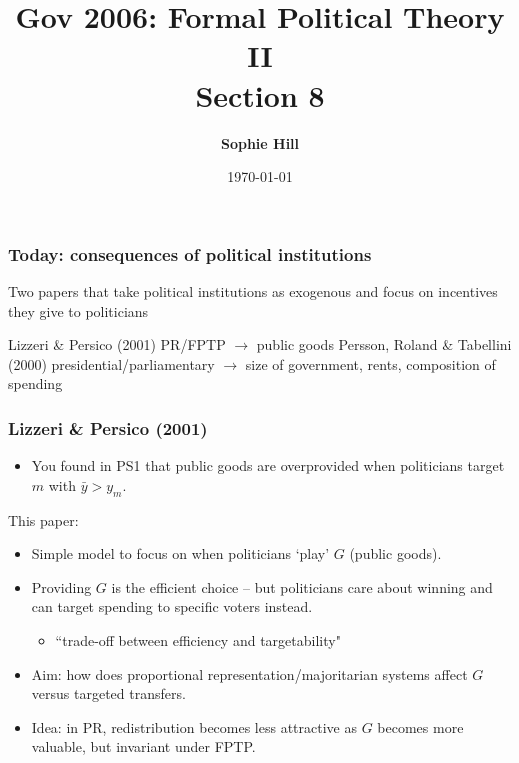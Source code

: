 \documentclass[11pt,aspectratio=169]{beamer}
\title{Gov 2006: Formal Political Theory II \\
Section 8}
\date{\today}
\author{ \textbf{Sophie Hill}}
\begin{document}
  \maketitle
  
\begin{frame} \frametitle{Today: consequences of political institutions}

 
Two papers that take political institutions as exogenous and focus on incentives they give to politicians

\vspace{1em}

\begin{outline}
\1 \alert{Lizzeri \& Persico (2001)}
\2 PR/FPTP $\rightarrow$ public goods
\vspace{1em}
\1 \alert{Persson, Roland \& Tabellini (2000)}
\2 presidential/parliamentary $\rightarrow$ size of government, rents, composition of spending
\end{outline}

\end{frame}




\begin{frame}
\frametitle{Lizzeri \& Persico (2001)}

\begin{itemize}
\item You found in PS1 that public goods are \alert{overprovided} when politicians target $m$ with $\bar{y} > y_m$.
\end{itemize}

\bigskip
\pause 

This paper:
\begin{itemize}
\item Simple model to focus on when politicians `play' $G$ (public goods).
\item Providing $G$ is the efficient choice -- but politicians care about winning and can target spending to specific voters instead.
\begin{itemize}
\item \alert{``trade-off between efficiency and targetability"}
\end{itemize}
\item Aim: how does proportional representation/majoritarian systems affect $G$ versus targeted transfers.
\item Idea: in PR, redistribution becomes less attractive as $G$ becomes more valuable, but invariant under FPTP.
\end{itemize}

\end{frame}
\end{document}
